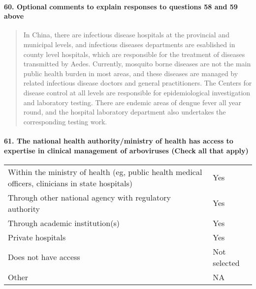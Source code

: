 \documentclass[
]{article}
\begin{document}
\hypertarget{optional-comments-to-explain-responses-to-questions-58-and-59-above}{%
\paragraph{60. Optional comments to explain responses to questions 58
and 59
above}\label{optional-comments-to-explain-responses-to-questions-58-and-59-above}}

\begin{quote}
In China, there are infectious disease hospitals at the provincial and
municipal levels, and infectious diseases departments are esablished in
county level hospitals, which are responsible for the treatment of
diseases transmitted by Aedes. Currently, mosquito borne diseases are
not the main public health burden in most areas, and these diseases are
managed by related infectious disease doctors and general practitioners.
The Centers for disease control at all levels are responsible for
epidemiological investigation and laboratory testing. There are endemic
areas of dengue fever all year round, and the hospital laboratory
department also undertakes the corresponding testing work.
\end{quote}

\hypertarget{the-national-health-authorityministry-of-health-has-access-to-expertise-in-clinical-management-of-arboviruses-check-all-that-apply}{%
\paragraph{61. The national health authority/ministry of health has
access to expertise in clinical management of arboviruses (Check all
that
apply)}\label{the-national-health-authorityministry-of-health-has-access-to-expertise-in-clinical-management-of-arboviruses-check-all-that-apply}}

\begin{longtable}[]{@{}
  >{\raggedright\arraybackslash}p{}
  >{\raggedright\arraybackslash}p{}@{}}
\toprule
\endhead
Within the ministry of health (eg, public health medical officers,
clinicians in state hospitals) & Yes \\
Through other national agency with regulatory authority & Yes \\
Through academic institution(s) & Yes \\
Private hospitals & Yes \\
Does not have access & Not selected \\
Other & NA \\
\bottomrule
\end{longtable}
\end{document}
